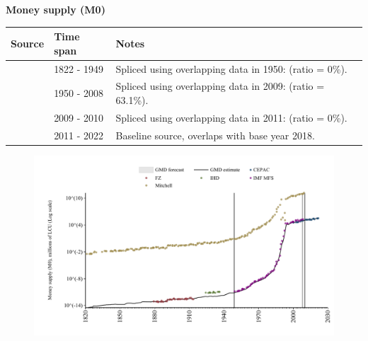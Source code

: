 \documentclass[12pt,a4paper,landscape]{article}
\begin{document}
\begin{adjustbox}{max totalsize={\paperwidth}{\paperheight},center}
\begin{minipage}[t][\textheight][t]{\textwidth}
\vspace*{0.5cm}
{}
\begin{center}
{\Large\bfseries Money supply (M0)}
\end{center}
\vspace{0.5cm}
\begin{table}[H]
\centering
\small
\begin{tabular}{|l|l|l|}
\hline
\textbf{Source} & \textbf{Time span} & \textbf{Notes} \\
\hline
\rowcolor{white}\cite{Mitchell}& 1822 - 1949 &Spliced using overlapping data in 1950: (ratio = 0\%). \\
\rowcolor{lightgray}\cite{IMF_MFS}& 1950 - 2008 &Spliced using overlapping data in 2009: (ratio = 63.1\%). \\
\rowcolor{white}\cite{Mitchell}& 2009 - 2010 &Spliced using overlapping data in 2011: (ratio = 0\%). \\
\rowcolor{lightgray}\cite{CEPAC}& 2011 - 2022 &Baseline source, overlaps with base year 2018. \\
\hline
\end{tabular}
\end{table}
\begin{figure}[H]
\centering
\includegraphics[width=\textwidth,height=0.6\textheight,keepaspectratio]{graphs/BRA_M0.pdf}
\end{figure}
\end{minipage}
\end{adjustbox}
\end{document}
